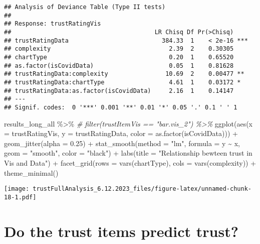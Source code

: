 \documentclass[
]{article}
\newenvironment{Shaded}{\begin{snugshade}}{\end{snugshade}}
\newcommand{\AttributeTok}[1]{\textcolor[rgb]{0.77,0.63,0.00}{#1}}
\newcommand{\CommentTok}[1]{\textcolor[rgb]{0.56,0.35,0.01}{\textit{#1}}}
\newcommand{\FloatTok}[1]{\textcolor[rgb]{0.00,0.00,0.81}{#1}}
\newcommand{\FunctionTok}[1]{\textcolor[rgb]{0.00,0.00,0.00}{#1}}
\newcommand{\NormalTok}[1]{#1}
\newcommand{\SpecialCharTok}[1]{\textcolor[rgb]{0.00,0.00,0.00}{#1}}
\newcommand{\StringTok}[1]{\textcolor[rgb]{0.31,0.60,0.02}{#1}}
\begin{document}
\begin{verbatim}
## Analysis of Deviance Table (Type II tests)
## 
## Response: trustRatingVis
##                                        LR Chisq Df Pr(>Chisq)    
## trustRatingData                          384.33  1    < 2e-16 ***
## complexity                                 2.39  2    0.30305    
## chartType                                  0.20  1    0.65520    
## as.factor(isCovidData)                     0.05  1    0.81628    
## trustRatingData:complexity                10.69  2    0.00477 ** 
## trustRatingData:chartType                  4.61  1    0.03172 *  
## trustRatingData:as.factor(isCovidData)     2.16  1    0.14147    
## ---
## Signif. codes:  0 '***' 0.001 '**' 0.01 '*' 0.05 '.' 0.1 ' ' 1
\end{verbatim}

\begin{Shaded}
\begin{Highlighting}[]
\NormalTok{results\_long\_all }\SpecialCharTok{\%\textgreater{}\%}
  \CommentTok{\# filter(trustItemVis == "bar.vis\_2") \%\textgreater{}\%}
  \FunctionTok{ggplot}\NormalTok{(}\FunctionTok{aes}\NormalTok{(}\AttributeTok{x =}\NormalTok{ trustRatingVis, }\AttributeTok{y =}\NormalTok{ trustRatingData, }\AttributeTok{color =} \FunctionTok{as.factor}\NormalTok{(isCovidData))) }\SpecialCharTok{+}
  \FunctionTok{geom\_jitter}\NormalTok{(}\AttributeTok{alpha =} \FloatTok{0.25}\NormalTok{) }\SpecialCharTok{+}
  \FunctionTok{stat\_smooth}\NormalTok{(}\AttributeTok{method =} \StringTok{"lm"}\NormalTok{,}
              \AttributeTok{formula =}\NormalTok{ y }\SpecialCharTok{\textasciitilde{}}\NormalTok{ x,}
              \AttributeTok{geom =} \StringTok{"smooth"}\NormalTok{, }\AttributeTok{color =} \StringTok{"black"}\NormalTok{) }\SpecialCharTok{+}
  \FunctionTok{labs}\NormalTok{(}\AttributeTok{title =} \StringTok{"Relationship bewteen trust in Vis and Data"}\NormalTok{) }\SpecialCharTok{+} 
  \FunctionTok{facet\_grid}\NormalTok{(}\AttributeTok{rows =} \FunctionTok{vars}\NormalTok{(chartType), }\AttributeTok{cols =} \FunctionTok{vars}\NormalTok{(complexity)) }\SpecialCharTok{+}
  \FunctionTok{theme\_minimal}\NormalTok{()}
\end{Highlighting}
\end{Shaded}

\texttt{[image: trustFullAnalysis\_6.12.2023\_files/figure-latex/unnamed-chunk-18-1.pdf]}

\hypertarget{do-the-trust-items-predict-trust}{%
\section{Do the trust items predict
trust?}\label{do-the-trust-items-predict-trust}}
\end{document}
